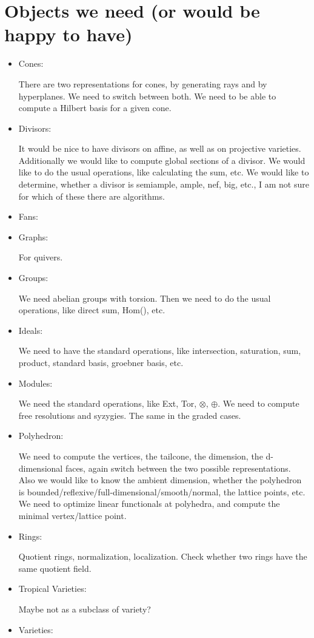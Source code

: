 \documentclass[a4paper]{article}
\begin{document}
\section{Objects we need (or would be happy to have)}
\begin{itemize}
\item Cones: 

There are two representations for cones, by generating rays and by hyperplanes. We need to switch between both.
We need to be able to compute a Hilbert basis for a given cone.
\item Divisors:

It would be nice to have divisors on affine, as well as on projective varieties. Additionally we would like to compute global sections of a divisor.
We would like to do the usual operations, like calculating the sum, etc.
We would like to determine, whether a divisor is semiample, ample, nef, big, etc., I am not sure for which of these there are algorithms.
\item Fans:

\item Graphs:

For quivers.
\item Groups:

We need abelian groups with torsion. Then we need to do the usual operations, like direct sum, Hom(), etc.
\item Ideals:

We need to have the standard operations, like intersection, saturation, sum, product, standard basis, groebner basis, etc.

\item Modules:

We need the standard operations, like Ext, Tor, $\otimes$, $\oplus$. We need to compute free resolutions and syzygies. The same in the graded cases.
\item Polyhedron:

We need to compute the vertices, the tailcone, the dimension, the d-dimensional faces, again switch between the two possible representations.
Also we would like to know the ambient dimension, whether the polyhedron is bounded/reflexive/full-dimensional/smooth/normal, the lattice points, etc.
We need to optimize linear functionals at polyhedra, and compute the minimal vertex/lattice point.
\item Rings:

Quotient rings, normalization, localization. Check whether two rings have the same quotient field.
\item Tropical Varieties:

Maybe not as a subclass of variety?
\item Varieties:

\end{itemize}
\end{document}
